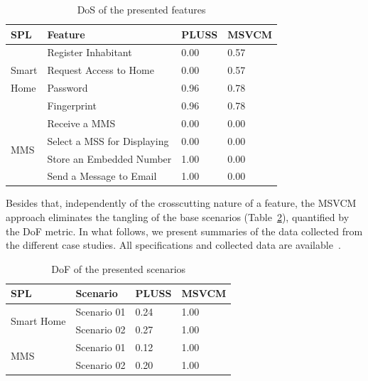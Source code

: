 \begin{table}[thb]
\centering
\caption{DoS of the presented features}
\label{tab:feature-dos}
\begin{small}
\begin{tabular}{p{0.25in}lll} \hline
SPL							&	Feature						& PLUSS	& MSVCM	\\ \hline 
 							&	Register Inhabitant				& 0.00  & 0.57  \\
Smart						&	Request Access to Home			& 0.00  & 0.57  \\ 
Home						&	Password						& 0.96  & 0.78  \\ 
							&	Fingerprint					& 0.96  & 0.78  \\ \hline
\multirow{4}{*}{MMS}	 		&	Receive a MMS				& 0.00  & 0.00  \\ 
							&	Select a MSS for Displaying		& 0.00  & 0.00  \\ 
							& 	Store an Embedded Number		& 1.00  & 0.00  \\
							& 	Send a Message to Email			& 1.00  & 0.00  \\ \hline		
\end{tabular}
\end{small}
\end{table}

Besides that, independently of the crosscutting nature of a feature, the
MSVCM approach eliminates the tangling of the base scenarios (Table~\ref{tab:scenario-dof}), quantified by the DoF metric.  In what follows, we present summaries of the data collected from the different case studies. All specifications and collected data are available~\cite{SPG:site}.


\begin{table}[htb]
\centering
\caption{DoF of the presented scenarios}
\label{tab:scenario-dof}
\begin{small}
\begin{tabular}{llll} \hline
SPL							&	Scenario		& PLUSS	& MSVCM	\\ \hline
\multirow{2}{*}{Smart Home} &	Scenario 01		& 0.24  & 1.00  \\
							&	Scenario 02		& 0.27  & 1.00  \\ \hline
\multirow{2}{*}{MMS} 		&	Scenario 01		& 0.12  & 1.00  \\ 
							&	Scenario 02		& 0.20  & 1.00  \\ \hline
\end{tabular}
\end{small}
\end{table}

